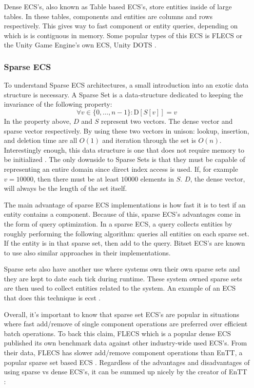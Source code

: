 Dense ECS's, also known as Table based ECS's, store entities inside of large tables. In these tables, components and entities are columns and rows respectively. This gives way to fast component or entity queries, depending on which is is contiguous in memory. Some popular types of this ECS is FLECS or the Unity Game Engine's own ECS, Unity DOTS \cite{SanderMertensFAQ}.

\subsubsection{Sparse ECS}
To understand Sparse ECS architectures, a small introduction into an exotic data structure is necessary. A Sparse Set is a data-structure dedicated to keeping the invariance of the following property:
\begin{equation*}
    \forall v \in \{0,\ldots, n-1\} : \text{D}[S[v]] = v
\end{equation*}
In the property above, $D$ and $S$ represent two vectors. The dense vector and sparse vector respectively. By using these two vectors in unison: lookup, insertion, and deletion time are all $O(1)$ and iteration through the set is $O(n)$. Interestingly enough, this data structure is one that does not require memory to be initialized \cite{sparse_profit}. The only downside to Sparse Sets is that they must be capable of representing an entire domain since direct index access is used. If, for example $v = 10000$, then there must be at least $10000$ elements in $S$. $D$, the dense vector, will always be the length of the set itself.

The main advantage of sparse ECS implementations is how fast it is to test if an entity contains a component. Because of this, sparse ECS's advantages come in the form of query optimization. In a sparse ECS, a query collects entities by roughly performing the following algorithm: queries all entities on each sparse set. If the entity is in that sparse set, then add to the query. Bitset ECS's are known to use also similar approaches in their implementations.\cite{EnTT_SparseSets}

Sparse sets also have another use where systems own their own sparse sets and they are kept to date each tick during runtime. These system owned sparse sets are then used to collect entities related to the system. An example of an ECS that does this technique is ecst \cite{ecst}.

Overall, it's important to know that sparse set ECS's are popular in situations where fast add/remove of single component operations are preferred over efficient batch operations. To back this claim, FLECS which is a popular dense ECS published its own benchmark data against other industry-wide used ECS's. From their data, FLECS has slower add/remove component operations than EnTT, a popular sparse set based ECS \cite{FLECS_EnTTCompare}. Regardless of the advantages and disadvantages of using sparse vs dense ECS's, it can be summed up nicely by the creator of EnTT \cite{EnTT_archetype_and_quote}:

